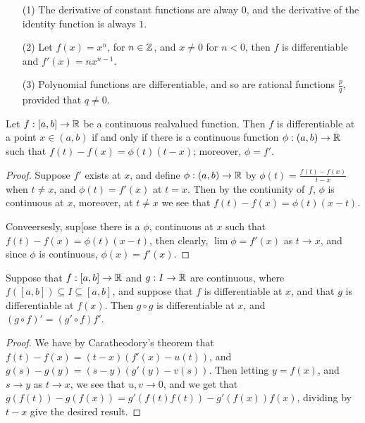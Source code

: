\begin{example}
    \begin{enumerate}
        \item[(1)] The derivative of constant functions are alway $0$, and the derivative of the
            identity function is always $1$.

        \item[(2)] Let  $f(x)=x^n$, for  $n \in \mathbb{Z}$, and  $x \neq 0$ for  $n<0$, then  $f$
            is differentiable and  $f'(x)=nx^{n-1}$.

        \item[(3)] Polynomial functions are differentiable, and so are rational functions  $ \frac{p}{q}$,
            provided that $q \neq 0$.
    \end{enumerate}
\end{example}

\begin{theorem}\label{6.1.3}
    Let $f:[a,b] \rightarrow \mathbb{R}$ be a continuous realvalued function. Then  $f$ is differentiable at
    a point  $x \in (a,b)$ if and only if there is a continuous function $\phi:(a,b) \rightarrow \mathbb{R}$
    such that $f(t)-f(x)=\phi(t)(t-x)$; moreover, $\phi=f'$.
\end{theorem}
\begin{proof}
    Suppose $f'$ exists at  $x$, and define  $\phi:(a,b) \rightarrow \mathbb{R}$ by  $\phi(t)=\frac{f(t)-f(x)}{t-x}$
    when $t \neq x$, and $\phi(t)=f'(x)$ at  $t=x$. Then by the contiunity of  $f$, $\phi$ is
    continuous at  $x$, moreover, at  $t \neq x$ we see that  $f(t)-f(x)=\phi(t)(x-t)$.

    Conveersesly, sup[ose there is a  $\phi$, continuous at $x$ such that  $f(t)-f(x)=\phi(t)(x-t)$,
    then clearly, $\lim{\phi}=f'(x)$ as $t \rightarrow x$, and since  $\phi$ is continuous, $\phi(x)=f'(x)$.
\end{proof}

\begin{theorem}\label{6.1.4}
    Suppose that $f:[a,b] \rightarrow \mathbb{R}$ and  $g:I \rightarrow \mathbb{R}$ are continuous, where  $f([a,b])
    \subseteq I \subseteq [a,b]$, and suppose that $f$ is differentiable at  $x$, and that $g$
    is differentiable at $f(x)$. Then  $g \circ g$ is differentiable at  $x$, and  $(g \circ f)'=(g' \circ f)f'$.
\end{theorem}
\begin{proof}
    We have by Caratheodory's theorem that  $f(t)-f(x)=(t-x)(f'(x)-u(t))$, and
    $g(s)-g(y)=(s-y)(g'(y)-v(s))$. Then letting $y=f(x)$, and  $s \rightarrow y$ as  $t \rightarrow x$,
    we see that  $u,v \rightarrow 0$, and we get that  $g(f(t))-g(f(x))=g'(f(t)f(t))-g'(f(x))f(x)$,
    dividing by  $t-x$ give the desired result.
\end{proof}

